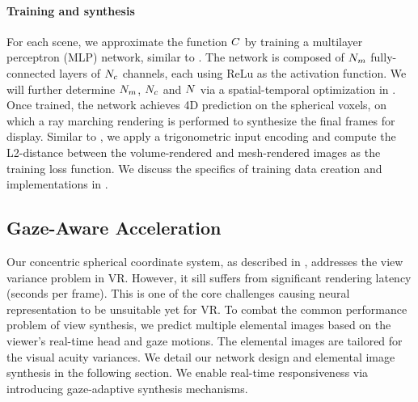 \paragraph{Training and synthesis}
For each scene, we approximate the function $C$ by training a multilayer perceptron (MLP) network, similar to \cite{mildenhall2020nerf}.
The network is composed of $N_{m}$ fully-connected layers of $N_{c}$ channels, each using ReLu as the activation function. We will further determine $N_{m}$, $N_{c}$ and $N$ via a spatial-temporal optimization in .
Once trained, the network achieves 4D prediction on the spherical voxels, on which a ray marching rendering is performed to synthesize the final frames for display.%
Similar to \cite{mildenhall2020nerf}, we apply a trigonometric input encoding and compute the L2-distance between the volume-rendered and mesh-rendered images as the training loss function. We discuss the specifics of training data creation and implementations in .

\subsection{Gaze-Aware Acceleration}
\label{sec:synthesis}
Our concentric spherical coordinate system, as described in , addresses the view variance problem in VR. However, it sill suffers from significant rendering latency (seconds per frame). This is one of the core challenges causing neural representation to be unsuitable yet for VR. To combat the common performance problem of view synthesis, we predict multiple elemental images based on the viewer's real-time head and gaze motions. The elemental images are tailored for the visual acuity variances. We detail our network design and elemental image synthesis in the following section. We enable real-time responsiveness via introducing gaze-adaptive synthesis mechanisms.

